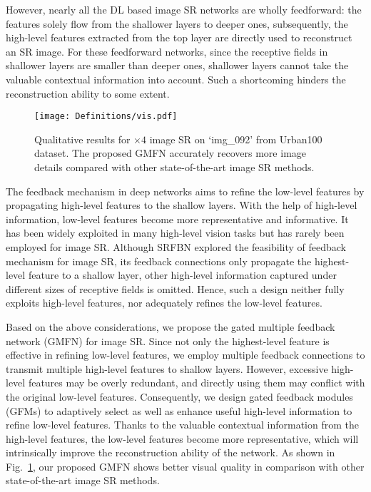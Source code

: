\documentclass{bmvc2k}
\begin{document}
	However, nearly all the DL based image SR networks are wholly feedforward: the features solely flow from the shallower layers to deeper ones, subsequently, the high-level features extracted from the top layer are directly used to reconstruct an SR image. For these feedforward networks, since the receptive fields in shallower layers are smaller than deeper ones, shallower layers cannot take the valuable contextual information into account. Such a shortcoming hinders the reconstruction ability to some extent. 

	\begin{figure}[tbp]
	\centering
	\texttt{[image: Definitions/vis.pdf]}
	\vspace{-5mm}
	\caption{Qualitative results for $\times 4$ image SR on `img\_092' from Urban100 dataset. The proposed GMFN accurately recovers more image details compared with other state-of-the-art image SR methods.}
	\label{fig:vis1}
	\vspace{-6mm}
	\end{figure} 
	
	The feedback mechanism in deep networks aims to refine the low-level features by propagating high-level features to the shallow layers. With the help of high-level information, low-level features become more representative and informative. It has been widely exploited in many high-level vision tasks \cite{carreira2016human, zamir2017feedback,jin2017multi, sam2018top, zhang2018progressive, li2019srfbn} but has rarely been employed for image SR. Although SRFBN \cite{li2019srfbn} explored the feasibility of feedback mechanism for image SR, its feedback connections only propagate the highest-level feature to a shallow layer, other high-level information captured under different sizes of receptive fields is omitted. Hence, such a design neither fully exploits high-level features, nor adequately refines the low-level features.
	
	Based on the above considerations, we propose the gated multiple feedback network (GMFN) for image SR. Since not only the highest-level feature is effective in refining low-level features, we employ multiple feedback connections to transmit multiple high-level features to shallow layers. However, excessive high-level features may be overly redundant, and directly using them may conflict with the original low-level features. Consequently, we design gated feedback modules (GFMs) to adaptively select as well as enhance useful high-level information to refine low-level features. Thanks to the valuable contextual information from the high-level features, the low-level features become more representative, which will intrinsically improve the reconstruction ability of the network. As shown in Fig.~\ref{fig:vis1}, our proposed GMFN shows better visual quality in comparison with other state-of-the-art image SR methods.
\end{document}

